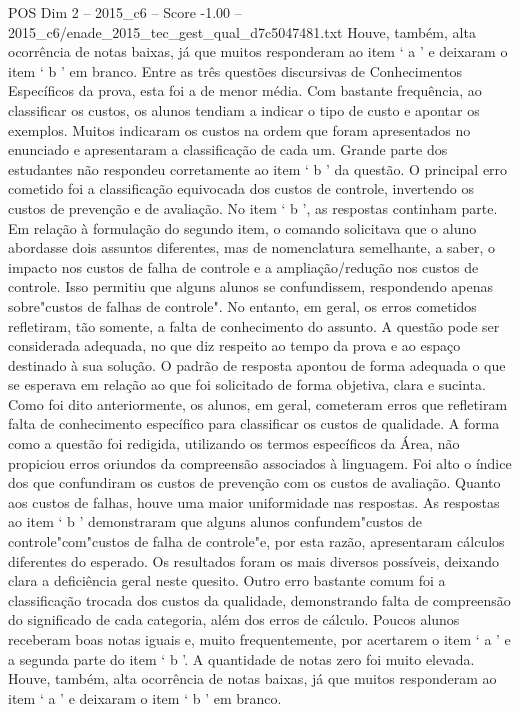 \begin{textsample}{POS Dim 2 – 2015\_c6 – Score -1.00 – 2015\_c6/enade\_2015\_tec\_gest\_qual\_d7c5047481.txt}
Houve, também, alta ocorrência de notas baixas, já que muitos responderam ao item ‘ a ’ e deixaram o item ‘ b ’ em branco.
Entre as três questões discursivas de Conhecimentos Específicos da prova, esta foi a de menor média.
Com bastante frequência, ao classificar os custos, os alunos tendiam a indicar o tipo de custo e apontar os exemplos.
Muitos indicaram os custos na ordem que foram apresentados no enunciado e apresentaram a classificação de cada um.
Grande parte dos estudantes não respondeu corretamente ao item ‘ b ’ da questão.
O principal erro cometido foi a classificação equivocada dos custos de controle, invertendo os custos de prevenção e de avaliação.
No item ‘ b ’, as respostas continham parte.
Em relação à formulação do segundo item, o comando solicitava que o aluno abordasse dois assuntos diferentes, mas de nomenclatura semelhante, a saber, o impacto nos custos de falha de controle e a ampliação/redução nos custos de controle.
Isso permitiu que alguns alunos se confundissem, respondendo apenas sobre"custos de falhas de controle".
No entanto, em geral, os erros cometidos refletiram, tão somente, a falta de conhecimento do assunto.
A questão pode ser considerada adequada, no que diz respeito ao tempo da prova e ao espaço destinado à sua solução.
O padrão de resposta apontou de forma adequada o que se esperava em relação ao que foi solicitado de forma objetiva, clara e sucinta.
Como foi dito anteriormente, os alunos, em geral, cometeram erros que refletiram falta de conhecimento específico para classificar os custos de qualidade.
A forma como a questão foi redigida, utilizando os termos específicos da Área, não propiciou erros oriundos da compreensão associados à linguagem.
Foi alto o índice dos que confundiram os custos de prevenção com os custos de avaliação.
Quanto aos custos de falhas, houve uma maior uniformidade nas respostas.
As respostas ao item ‘ b ’ demonstraram que alguns alunos confundem"custos de controle"com"custos de falha de controle"e, por esta razão, apresentaram cálculos diferentes do esperado.
Os resultados foram os mais diversos possíveis, deixando clara a deficiência geral neste quesito.
Outro erro bastante comum foi a classificação trocada dos custos da qualidade, demonstrando falta de compreensão do significado de cada categoria, além dos erros de cálculo.
Poucos alunos receberam boas notas iguais e, muito frequentemente, por acertarem o item ‘ a ’ e a segunda parte do item ‘ b ’.
A quantidade de notas zero foi muito elevada.
Houve, também, alta ocorrência de notas baixas, já que muitos responderam ao item ‘ a ’ e deixaram o item ‘ b ’ em branco.

\end{textsample}
